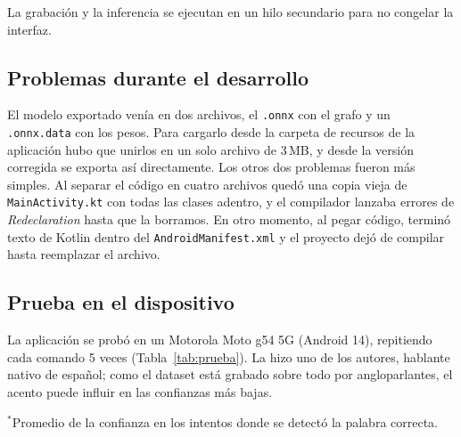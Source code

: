 \documentclass[conference]{IEEEtran}
\begin{document}
La grabación y la inferencia se ejecutan en un hilo secundario para no congelar la interfaz.

\subsection{Problemas durante el desarrollo}
El modelo exportado venía en dos archivos, el \texttt{.onnx} con el grafo y un \texttt{.onnx.data} con los pesos. Para cargarlo desde la carpeta de recursos de la aplicación hubo que unirlos en un solo archivo de 3\,MB, y desde la versión corregida se exporta así directamente. Los otros dos problemas fueron más simples. Al separar el código en cuatro archivos quedó una copia vieja de \texttt{MainActivity.kt} con todas las clases adentro, y el compilador lanzaba errores de \textit{Redeclaration} hasta que la borramos. En otro momento, al pegar código, terminó texto de Kotlin dentro del \texttt{AndroidManifest.xml} y el proyecto dejó de compilar hasta reemplazar el archivo.

\subsection{Prueba en el dispositivo}
La aplicación se probó en un Motorola Moto g54 5G (Android 14), repitiendo cada comando 5 veces (Tabla~\ref{tab:prueba}). La hizo uno de los autores, hablante nativo de español; como el dataset está grabado sobre todo por angloparlantes, el acento puede influir en las confianzas más bajas.

\begin{table}[htbp]
\caption{Prueba en el dispositivo (5 intentos por comando)}
\label{tab:prueba}
\centering
{}

\vspace{2pt}
\parbox{\columnwidth}{\footnotesize $^{*}$Promedio de la confianza en los intentos donde se detectó la palabra correcta.}
\end{table}
\end{document}
